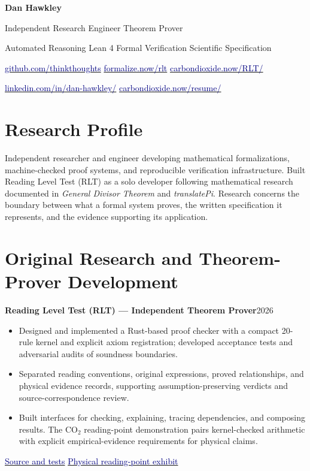 \documentclass[10pt,letterpaper]{article}
\newcommand{\entry}[2]{\textbf{#1}\hfill {\small\color{muted}#2}\par}
\newcommand{\site}[2]{\href{#1}{\textcolor{navy}{#2}}}
\newcommand{\subline}[1]{{\small\color{muted}#1}\par}
\begin{document}
{\fontsize{24}{27}\selectfont\color{navy}\bfseries Dan Hawkley}\par
\vspace{2pt}
{\large Independent Research Engineer \textbar{} Theorem Prover}\par
\subline{Automated Reasoning \textbar{} Lean 4 \textbar{} Formal Verification \textbar{} Scientific Specification}
\vspace{4pt}
{\small
\site{https://github.com/thinkthoughts}{github.com/thinkthoughts}\quad\textbar\quad
\site{https://formalize.now/rlt/}{formalize.now/rlt}\quad\textbar\quad
\site{https://carbondioxide.now/RLT/}{carbondioxide.now/RLT/}\par
\site{https://www.linkedin.com/in/dan-hawkley/}{linkedin.com/in/dan-hawkley/}\quad\textbar\quad
\site{https://carbondioxide.now/resume/}{carbondioxide.now/resume/}
}

\section*{Research Profile}
Independent researcher and engineer developing mathematical formalizations, machine-checked proof systems, and reproducible verification infrastructure. Built Reading Level Test (RLT) as a solo developer following mathematical research documented in \emph{General Divisor Theorem} and \emph{translatePi}. Research concerns the boundary between what a formal system proves, the written specification it represents, and the evidence supporting its application.

\section*{Original Research and Theorem-Prover Development}
\entry{Reading Level Test (RLT) --- Independent Theorem Prover}{2026}
\begin{itemize}
  \item Designed and implemented a Rust-based proof checker with a compact 20-rule kernel and explicit axiom registration; developed acceptance tests and adversarial audits of soundness boundaries.
  \item Separated reading conventions, original expressions, proved relationships, and physical evidence records, supporting assumption-preserving verdicts and source-correspondence review.
  \item Built interfaces for checking, explaining, tracing dependencies, and composing results. The CO$_2$ reading-point demonstration pairs kernel-checked arithmetic with explicit empirical-evidence requirements for physical claims.
\end{itemize}
\subline{\site{https://github.com/thinkthoughts/rlt}{Source and tests} \textbar{} \site{https://carbondioxide.now/RLT/}{Physical reading-point exhibit}}
\end{document}
